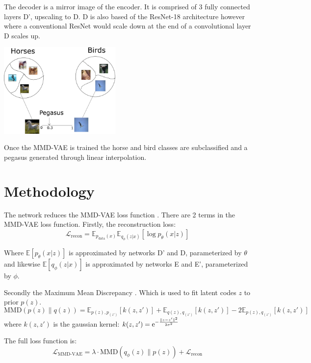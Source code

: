 \documentclass{article}
\begin{document}
The decoder is a mirror image of the encoder. It is comprised of 3 fully connected layers D', upscaling to D. D is also based of the ResNet-18 architecture however where a conventional ResNet would scale down at the end of a convolutional layer D scales up.



\begin{center}
    \includegraphics[width=0.45\textwidth]{figures/clustering.png}
\end{center}

Once the MMD-VAE is trained the horse and bird classes are subclassified and a pegasus generated through linear interpolation.

\section{Methodology}
The network reduces the MMD-VAE loss function \cite{infovae}. 
There are 2 terms in the MMD-VAE loss function. Firstly, the reconstruction loss:
\begin{equation}
    \mathcal{L}_{\textrm{recon}} = \mathbb{E}_{p_{\textrm{data}}(x)} \mathbb{E}_{q_\phi (z|x)} [\log p_\theta(x|z)]
\end{equation}

Where $\mathbb{E}[p_\theta(x|z)]$ is approximated by networks D' and D, parameterized by $\theta$ and likewise $\mathbb{E}[q_\phi(z|x)]$ is approximated by networks E and E', parameterized by $\phi$.


Secondly the Maximum Mean Discrepancy \cite{mmd}. Which is used to fit latent codes $z$ to prior $p(z)$.
\begin{equation}
    \textrm{MMD}(p(z) \lVert q(z)) = \mathbb{E}_{p(z), p_(z')}[k(z, z')] + \mathbb{E}_{q(z), q_(z')}[k(z, z')] - 2 \mathbb{E}_{p(z), q_(z')}[k(z, z')]
\end{equation}
where $k(z, z')$ is the gaussian kernel: $k(z, z')={\rm e}^{-\frac{\lVert z-z' \rVert^2}{2\sigma^2}}$

The full loss function is:
\begin{equation}
    \mathcal{L}_\textrm{MMD-VAE} = \lambda \cdot \textrm{MMD}(q_\phi (z) \lVert p(z)) + \mathcal{L}_{\textrm{recon}}
\end{equation}
\end{document}
